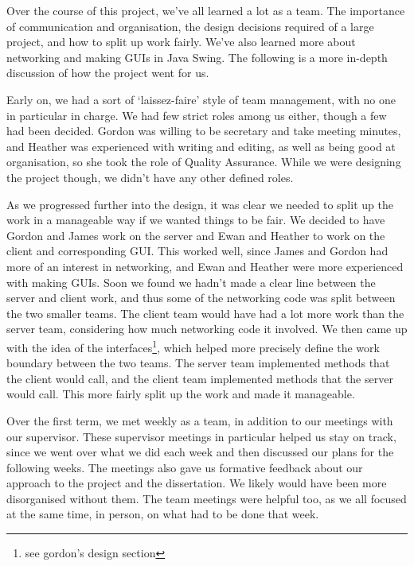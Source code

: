Over the course of this project, we've all learned a lot as a team. The importance of communication and organisation, the design decisions required of a large project, and how to split up work fairly. We've also learned more about networking and making GUIs in Java Swing. The following is a more in-depth discussion of how the project went for us.

Early on, we had a sort of `laissez-faire' style of team management, with no one in particular in charge. We had few strict roles among us either, though a few had been decided. Gordon was willing to be secretary and take meeting minutes, and Heather was experienced with writing and editing, as well as being good at organisation, so she took the role of Quality Assurance. While we were designing the project though, we didn't have any other defined roles.

As we progressed further into the design, it was clear we needed to split up the work in a manageable way if we wanted things to be fair. We decided to have Gordon and James work on the server and Ewan and Heather to work on the client and corresponding GUI. This worked well, since James and Gordon had more of an interest in networking, and Ewan and Heather were more experienced with making GUIs. Soon we found we hadn't made a clear line between the server and client work, and thus some of the networking code was split between the two smaller teams. The client team would have had a lot more work than the server team, considering how much networking code it involved. We then came up with the idea of the interfaces\footnote{see gordon's design section}, which helped more precisely define the work boundary between the two teams. The server team implemented methods that the client would call, and the client team implemented methods that the server would call. This more fairly split up the work and made it manageable.

Over the first term, we met weekly as a team, in addition to our meetings with our supervisor. These supervisor meetings in particular helped us stay on track, since we went over what we did each week and then discussed our plans for the following weeks. The meetings also gave us formative feedback about our approach to the project and the dissertation. We likely would have been more disorganised without them. The team meetings were helpful too, as we all focused at the same time, in person, on what had to be done that week.

